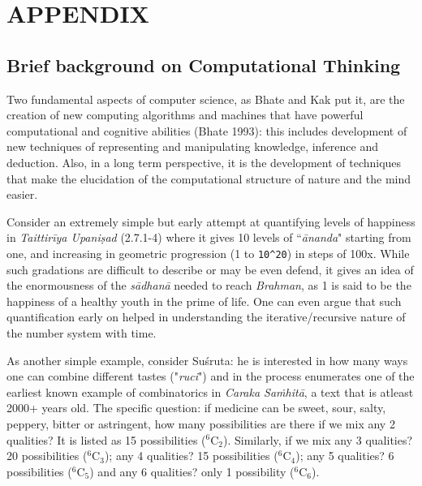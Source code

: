 {\appendix
\section{APPENDIX}\label{chap3-app1}


\subsection*{Brief background on Computational Thinking}

Two fundamental aspects of computer science, as Bhate and Kak put it, are the creation of new computing algorithms and machines that have powerful computational and cognitive abilities (Bhate 1993): this includes development of new techniques of representing and manipulating knowledge, inference and deduction. Also, in a long term perspective, it is the development of techniques that make the elucidation of the computational structure of nature and the mind easier.

Consider an extremely simple but early attempt at quantifying levels of happiness in \textsl{Taittirīya Upaniṣad} (2.7.1-4) where it gives 10 levels of “\textsl{ānanda}" starting from one, and increasing in geometric progression (1 to \verb|10^20|) in steps of 100x. While such gradations are difficult to describe or may be even defend, it gives an idea of the enormousness of the \textsl{sādhanā} needed to reach \textsl{Brahman}, as 1 is said to be the happiness of a healthy youth in the prime of life. One can even argue that such quantification early on helped in understanding the iterative/recursive nature of the number system with time.

As another simple example, consider Suśruta: he is interested in how many ways one can combine different tastes ("\textsl{ruci}") and in the process enumerates one of the earliest known example of combinatorics in \textsl{Caraka Saṁhitā}, a text that is atleast 2000+ years old. The specific question: if medicine can be sweet, sour, salty, peppery, bitter or astringent, how many possibilities are there if we mix any 2 qualities? It is listed as 15 possibilities ($^{6}$C$_{2}$). Similarly, if we mix any 3 qualities? 20 possibilities ($^{6}$C$_{3}$); any 4 qualities? 15 possibilities ($^{6}$C$_{4}$); any 5 qualities? 6 possibilities ($^{6}$C$_{5}$) and any 6 qualities? only 1 possibility ($^{6}$C$_{6}$).


}
